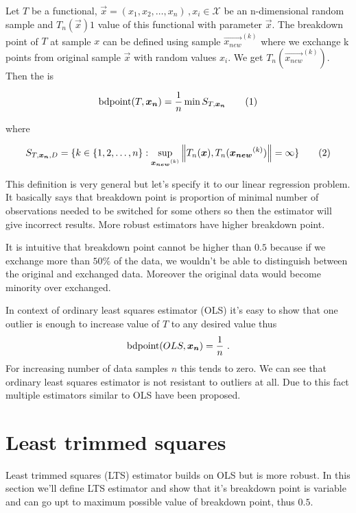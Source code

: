 \begin{definition}
    Let $T$ be a functional, $\vec{x} = (x_1, x_2,\ldots,x_n)\,, x_i \in \mathcal{X}$ be an n-dimensional random sample and $T_n(\vec{x})1$ value of this functional with parameter $\vec{x}$. The breakdown point of $T$ at sample $x$ can be defined using sample $\vec{x_{new}}^(k)$ where we exchange k points from original sample $\vec{x}$ with random values $x_i$. We get $T_n(\vec{x_{new}}^{(k)})$. Then the  is 


\begin{equation}
    \bdpoint(T,\vec{x_n} ) = \frac{1}{n} \min S_{T, \vec{x_n}}  \numberthis
\end{equation}

where 

\begin{equation}
   S_{T, \vec{x_n}, D} =   \{{k \in \{{1,2, \ldots ,n\}} : \sup_{ \vec{x_{new}}^{(k)} } \norm{T_n(\vec{x}), T_n(\vec{x_{new}}^{(k)})} = \infty   \}}   \numberthis
\end{equation}


\end{definition}

This definition is very general but let's specify it to our linear regression problem. It basically says that breakdown point is proportion of minimal number of observations needed to be switched for some others so then the estimator will give incorrect results. More robust estimators have higher breakdown point. 

It is intuitive that breakdown point cannot be higher than $0.5$ \cite{rouss:1986} because if we exchange more than $50\%$ of the data, we wouldn't be able to distinguish between the original and exchanged data. Moreover the original data would become minority over exchanged.


In context of ordinary least squares estimator (OLS) it's easy to show that one outlier is enough to increase value of $T$ to any desired value thus 
\begin{equation}
    \bdpoint(OLS,\vec{x_n} ) = \frac{1}{n}\ .
\end{equation}
For increasing number of data samples $n$ this tends to zero. We can see that ordinary least squares estimator is not resistant to outliers at all. Due to this fact multiple estimators similar to OLS have been proposed. 


\section{Least trimmed squares}
Least trimmed squares (LTS) estimator builds on OLS but is more robust. In this section we'll define LTS estimator and show that it's breakdown point is variable and can go upt to maximum possible value of breakdown point, thus $0.5$.



